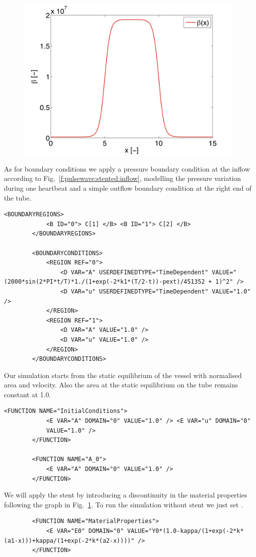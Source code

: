\begin{figure}
	\centering
	\includegraphics[width=0.49\linewidth]{Figures/betax.png}
	\caption{}
	\label{f:pulsewave:stented:betax}
\end{figure}

As for boundary conditions we apply a pressure boundary condition at the inflow
according to Fig.~\ref{f:pulsewave:stented:inflow}, modelling the pressure
variation during one heartbeat and a simple outflow boundary condition at the
right end of the tube.
\begin{lstlisting}[style=XmlStyle]
        <BOUNDARYREGIONS>
            <B ID="0"> C[1] </B> <B ID="1"> C[2] </B>
        </BOUNDARYREGIONS>

        <BOUNDARYCONDITIONS>
            <REGION REF="0">
                <D VAR="A" USERDEFINEDTYPE="TimeDependent" VALUE="(2000*sin(2*PI*t/T)*1./(1+exp(-2*k1*(T/2-t))-pext)/451352 + 1)^2" />
                <D VAR="u" USERDEFINEDTYPE="TimeDependent" VALUE="1.0" />
            </REGION>
            <REGION REF="1">
                <D VAR="A" VALUE="1.0" />
                <D VAR="u" VALUE="1.0" />
            </REGION>
        </BOUNDARYCONDITIONS>
\end{lstlisting}

Our simulation starts from the static equilibrium of the vessel with normalised
area and velocity. Also the area at the static equilibrium on the tube remains
constant at 1.0.
\begin{lstlisting}[style=XmlStyle]
        <FUNCTION NAME="InitialConditions">
            <E VAR="A" DOMAIN="0" VALUE="1.0" /> <E VAR="u" DOMAIN="0"
            VALUE="1.0" />
        </FUNCTION>
        
        <FUNCTION NAME="A_0">
            <E VAR="A" DOMAIN="0" VALUE="1.0" />
        </FUNCTION>
\end{lstlisting}

We will apply the stent by introducing a discontinuity in the material
properties following the graph in Fig.~\ref{f:pulsewave:stented:betax}. To run
the simulation without stent we just set .
\begin{lstlisting}
        <FUNCTION NAME="MaterialProperties"> 
            <E VAR="E0" DOMAIN="0" VALUE="Y0*(1.0-kappa/(1+exp(-2*k*(a1-x)))+kappa/(1+exp(-2*k*(a2-x))))" />        
        </FUNCTION>
\end{lstlisting}

